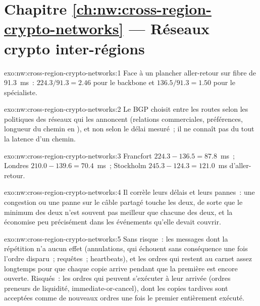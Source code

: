 \section*{Chapitre \ref{ch:nw:cross-region-crypto-networks} --- Réseaux crypto inter-régions}

\begin{solution}{exo:nw:cross-region-crypto-networks:1}
Face à un plancher aller-retour sur fibre de \qty{91.3}{\milli\second}~: $224.3/91.3 = 2.46$ pour le backbone et $136.5/91.3 = 1.50$ pour le spécialiste.
\end{solution}

\begin{solution}{exo:nw:cross-region-crypto-networks:2}
Le BGP choisit entre les routes selon les politiques des réseaux qui les annoncent (relations commerciales, préférences, longueur du chemin en ),
et non selon le délai mesuré~; il ne connaît pas du tout la latence d'un chemin.
\end{solution}

\begin{solution}{exo:nw:cross-region-crypto-networks:3}
Francfort $224.3 - 136.5 = 87.8$~ms~; Londres $210.0 - 139.6 = 70.4$~ms~; Stockholm $245.3 - 124.3 = 121.0$~ms d'aller-retour.
\end{solution}

\begin{solution}{exo:nw:cross-region-crypto-networks:4}
Il corrèle leurs délais et leurs pannes~: une congestion ou une panne sur le câble partagé touche les deux, de sorte que le minimum des deux n'est souvent pas meilleur
que chacune des deux, et la  économise peu précisément dans les événements qu'elle devait couvrir.
\end{solution}

\begin{solution}{exo:nw:cross-region-crypto-networks:5}
Sans risque~: les messages dont la répétition n'a aucun effet (annulations, qui échouent sans conséquence une fois l'ordre disparu~; requêtes~; heartbeats), et les ordres qui restent au carnet assez longtemps
pour que chaque copie arrive pendant que la première est encore ouverte. Risqués~: les ordres qui peuvent s'exécuter à leur arrivée (ordres preneurs de liquidité, immediate-or-cancel), dont les
copies tardives sont acceptées comme de nouveaux ordres une fois le premier entièrement exécuté.
\end{solution}


